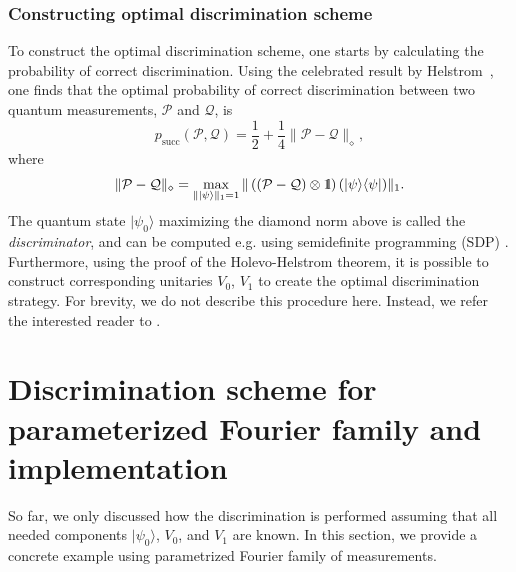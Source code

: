 \documentclass[preprint,12pt, a4paper, dvipsnames]{elsarticle}
\newcommand{\ket}[1]{\ensuremath{|#1\rangle}}
\newcommand{\bra}[1]{\ensuremath{\langle#1|}}
\newcommand{\ketbra}[2]{\ensuremath{\ket{#1}\bra{#2}}}
\newcommand{\proj}[1]{\ensuremath{\ketbra{#1}{#1}}}
\newcommand{\1}{{\rm 1\hspace{-0.9mm}l}}
\newcommand{\PP}{\mathcal{P}}
\newcommand{\QQ}{\mathcal{Q}}
\theoremstyle{definition}
\begin{document}
\subsubsection{Constructing optimal discrimination scheme}
To construct the optimal discrimination scheme, one starts by calculating the probability of correct discrimination. Using the celebrated result by Helstrom~\cite{helstrom1976quantum}, one finds that the  optimal probability of correct discrimination between two quantum measurements, $\PP$  and $\mathcal{Q}$, is
\begin{equation}
p_{\text{succ}}(\PP, \mathcal{Q}) =  \frac12 + \frac14 \| \PP - \mathcal{Q} \|_\diamond,
\end{equation}
where
\begin{equation}
\|\PP - \QQ\|_\diamond = \max_{\| \ket{\psi}\|_1=1} \| \left( (\PP - \QQ) \otimes \1\right) (\proj{\psi}) \|_1.
\end{equation}
The quantum state $\ket{\psi_0}$ maximizing the diamond norm above is called the
\emph{discriminator}, and can be computed e.g. using semidefinite programming (SDP)
\cite{watrous,watrous2021simplier}. Furthermore,  using the proof of the Holevo-Helstrom theorem, it is
possible to construct corresponding unitaries $V_0$, $V_1$ to create the optimal
discrimination strategy. For brevity, we do not describe this procedure here. Instead, we refer the
interested reader to \cite{watrous}.

\section{Discrimination scheme for parameterized Fourier family and implementation}
\label{sec:fourier}
So far, we only discussed how the discrimination is performed assuming that all needed components
$\ket{\psi_0}$, $V_0$, and $V_1$ are known. In this section, we provide a concrete example using
parametrized Fourier family of measurements.
\end{document}
